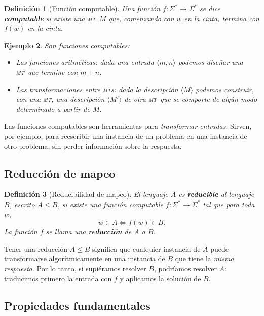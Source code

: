 \documentclass[11pt,a4paper]{article}
\theoremstyle{definicion}
\newtheorem{definicion}{Definición}[section]
\newtheorem{ejemplo}[definicion]{Ejemplo}
\newcommand{\MT}{\textsc{mt}}
\newcommand{\MTs}{\textsc{mt}s}
\newcommand{\enc}[1]{\langle #1 \rangle}
\begin{document}
\begin{definicion}[Función computable]
Una función $f : \Sigma^* \to \Sigma^*$ se dice \textbf{computable} si existe una \MT\ $M$ que, comenzando con $w$ en la cinta, termina con $f(w)$ en la cinta.
\end{definicion}

\begin{ejemplo}
Son funciones computables:
\begin{itemize}
    \item Las funciones aritméticas: dada una entrada $\enc{m, n}$ podemos diseñar una \MT\ que termine con $m + n$.
    \item Las transformaciones entre \MTs: dada la descripción $\enc{M}$ podemos construir, con una \MT, una descripción $\enc{M'}$ de otra \MT\ que se comporte de algún modo determinado a partir de $M$.
\end{itemize}
\end{ejemplo}

\begin{idea}
Las funciones computables son herramientas para \emph{transformar entradas}. Sirven, por ejemplo, para reescribir una instancia de un problema en una instancia de otro problema, sin perder información sobre la respuesta.
\end{idea}

\subsection{Reducción de mapeo}

\begin{definicion}[Reducibilidad de mapeo]
El lenguaje $A$ es \textbf{reducible} al lenguaje $B$, escrito $A \leq B$, si existe una función computable $f : \Sigma^* \to \Sigma^*$ tal que para toda $w$,
\[
w \in A \iff f(w) \in B.
\]
La función $f$ se llama una \textbf{reducción} de $A$ a $B$.
\end{definicion}

\begin{intuicion}
Tener una reducción $A \leq B$ significa que cualquier instancia de $A$ puede transformarse algorítmicamente en una instancia de $B$ que tiene la \emph{misma respuesta}. Por lo tanto, si supiéramos resolver $B$, podríamos resolver $A$: traducimos primero la entrada con $f$ y aplicamos la solución de $B$.
\end{intuicion}

\subsection{Propiedades fundamentales}
\end{document}
